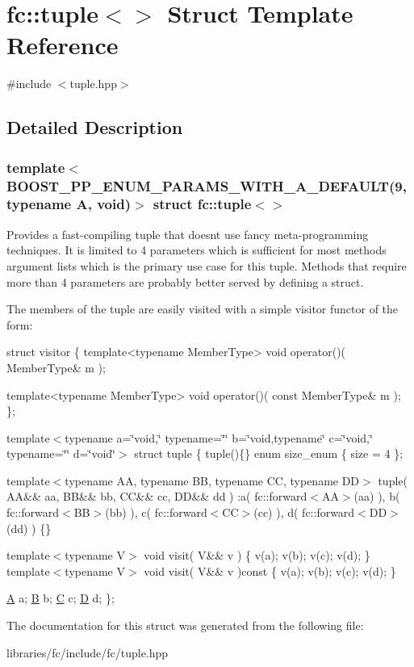 \hypertarget{structfc_1_1tuple}{}\section{fc\+:\+:tuple$<$$>$ Struct Template Reference}
\label{structfc_1_1tuple}


{\ttfamily \#include $<$tuple.\+hpp$>$}



\subsection{Detailed Description}
\subsubsection*{template$<$B\+O\+O\+S\+T\+\_\+\+P\+P\+\_\+\+E\+N\+U\+M\+\_\+\+P\+A\+R\+A\+M\+S\+\_\+\+W\+I\+T\+H\+\_\+\+A\+\_\+\+D\+E\+F\+A\+U\+L\+T(9, typename A, void)$>$\newline
struct fc\+::tuple$<$$>$}

Provides a fast-\/compiling tuple that doesn\textquotesingle{}t use fancy meta-\/programming techniques. It is limited to 4 parameters which is sufficient for most methods argument lists which is the primary use case for this tuple. Methods that require more than 4 parameters are probably better served by defining a struct.

The members of the tuple are easily visited with a simple visitor functor of the form\+: 
\begin{DoxyCode}
\textcolor{keyword}{struct }visitor \{
  \textcolor{keyword}{template}<\textcolor{keyword}{typename} MemberType>
  \textcolor{keywordtype}{void} operator()( MemberType& m );

  \textcolor{keyword}{template}<\textcolor{keyword}{typename} MemberType>
  \textcolor{keywordtype}{void} operator()( \textcolor{keyword}{const} MemberType& m );
\};
\end{DoxyCode}
 template$<$typename a=\char`\"{}void,\char`\"{} typename=\char`\"{}\char`\"{} b=\char`\"{}void,typename\char`\"{} c=\char`\"{}void,\char`\"{} typename=\char`\"{}\char`\"{} d=\char`\"{}void\char`\"{}$>$ struct tuple \{ tuple()\{\} enum size\+\_\+enum \{ size = 4 \};

template$<$typename A\+A, typename B\+B, typename C\+C, typename D\+D$>$ tuple( A\+A\&\& aa, B\+B\&\& bb, C\+C\&\& cc, D\+D\&\& dd ) \+:a( fc\+::forward$<$\+A\+A$>$(aa) ), b( fc\+::forward$<$\+B\+B$>$(bb) ), c( fc\+::forward$<$\+C\+C$>$(cc) ), d( fc\+::forward$<$\+D\+D$>$(dd) ) \{\}

template$<$typename V$>$ void visit( V\&\& v ) \{ v(a); v(b); v(c); v(d); \} template$<$typename V$>$ void visit( V\&\& v )const \{ v(a); v(b); v(c); v(d); \}

\mbox{\hyperlink{struct_a}{A}} a; \mbox{\hyperlink{struct_b}{B}} b; \mbox{\hyperlink{struct_c}{C}} c; \mbox{\hyperlink{struct_d}{D}} d; \}; 

The documentation for this struct was generated from the following file\+:\begin{DoxyCompactItemize}
\item 
libraries/fc/include/fc/tuple.\+hpp\end{DoxyCompactItemize}
